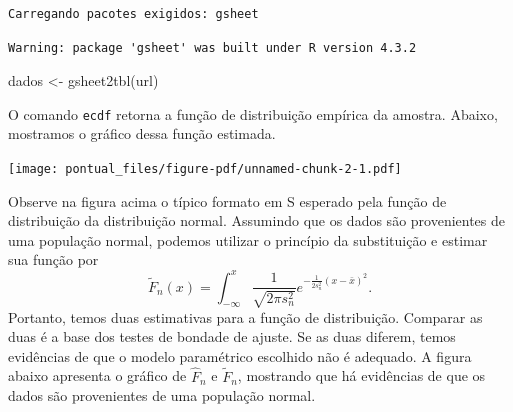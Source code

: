 \documentclass[
  letterpaper,
  DIV=11,
  numbers=noendperiod]{scrartcl}
\newenvironment{Shaded}{\begin{snugshade}}{\end{snugshade}}
\newcommand{\AttributeTok}[1]{\textcolor[rgb]{0.40,0.45,0.13}{#1}}
\newcommand{\FunctionTok}[1]{\textcolor[rgb]{0.28,0.35,0.67}{#1}}
\newcommand{\NormalTok}[1]{\textcolor[rgb]{0.00,0.23,0.31}{#1}}
\newcommand{\OtherTok}[1]{\textcolor[rgb]{0.00,0.23,0.31}{#1}}
\newcommand{\SpecialCharTok}[1]{\textcolor[rgb]{0.37,0.37,0.37}{#1}}
\newcommand{\StringTok}[1]{\textcolor[rgb]{0.13,0.47,0.30}{#1}}
\begin{document}
\begin{verbatim}
Carregando pacotes exigidos: gsheet
\end{verbatim}

\begin{verbatim}
Warning: package 'gsheet' was built under R version 4.3.2
\end{verbatim}

\begin{Shaded}
\begin{Highlighting}[]
\NormalTok{dados }\OtherTok{\textless{}{-}}  \FunctionTok{gsheet2tbl}\NormalTok{(url)}
\end{Highlighting}
\end{Shaded}

O comando \texttt{ecdf} retorna a função de distribuição empírica da
amostra. Abaixo, mostramos o gráfico dessa função estimada.

\begin{Shaded}
\end{Shaded}

\texttt{[image: pontual\_files/figure-pdf/unnamed-chunk-2-1.pdf]}

Observe na figura acima o típico formato em S esperado pela função de
distribuição da distribuição normal. Assumindo que os dados são
provenientes de uma população normal, podemos utilizar o princípio da
substituição e estimar sua função por
\[\tilde{F}_n(x)=\int_{-\infty}^x \frac{1}{\sqrt{2\pi s_n^2}}e^{-\frac{1}{2s_n^2}(x-\bar{x})^2}.\]
Portanto, temos duas estimativas para a função de distribuição. Comparar
as duas é a base dos testes de bondade de ajuste. Se as duas diferem,
temos evidências de que o modelo paramétrico escolhido não é adequado. A
figura abaixo apresenta o gráfico de \(\hat{F}_n\) e \(\tilde{F}_n\),
mostrando que há evidências de que os dados são provenientes de uma
população normal.
\end{document}
